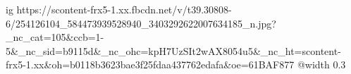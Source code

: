  
 
 
 
 

\ifcmt
  ig https://scontent-frx5-1.xx.fbcdn.net/v/t39.30808-6/254126104_584473939528940_3403292622007634185_n.jpg?_nc_cat=105&ccb=1-5&_nc_sid=b9115d&_nc_ohc=kpH7UzSIt2wAX8054u5&_nc_ht=scontent-frx5-1.xx&oh=b0118b3623bae3f25fdaa437762edafa&oe=61BAF877
  @width 0.3
\fi

